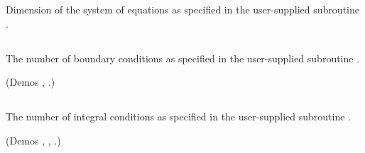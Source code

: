 
 Dimension of the system of equations as specified in the user-supplied
 subroutine .

\subsection{}  \label{sec:NBC}


 The number of boundary conditions as specified in the user-supplied
 subroutine . 

 (Demos , .)

\subsection{}  \label{sec:NINT}


 The number of integral conditions as specified in the user-supplied
 subroutine . 

(Demos , , .)

\subsection{}  \label{sec:JAC}



